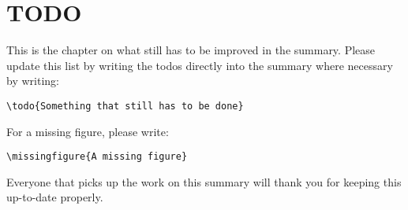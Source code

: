 \documentclass[main]{subfiles}
\begin{document}
\section{TODO}
This is the chapter on what still has to be improved in the summary. Please update this list by writing the todos directly into the summary where necessary by writing: \begin{verbatim}
\todo{Something that still has to be done}
\end{verbatim}
For a missing figure, please write: 
\begin{verbatim}
\missingfigure{A missing figure}
\end{verbatim}
Everyone that picks up the work on this summary will thank you for keeping this up-to-date properly.
\listoftodos
\end{document}
